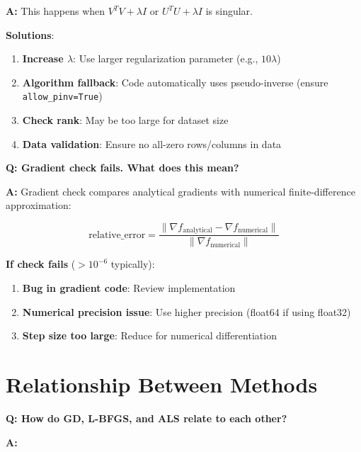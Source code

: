 \documentclass[11pt,oneside]{article}
\newcommand{\grad}{\nabla}
\newcommand{\question}[1]{\textbf{Q: #1}}
\newcommand{\answer}{\textbf{A: }}
\begin{document}
\answer This happens when $V^T V + \lambda I$ or $U^T U + \lambda I$ is singular.

\textbf{Solutions}:

\begin{enumerate}
    \item \textbf{Increase $\lambda$}: Use larger regularization parameter (e.g., $10 \lambda$)
    \item \textbf{Algorithm fallback}: Code automatically uses pseudo-inverse (ensure \texttt{allow\_pinv=True})
    \item \textbf{Check rank}: May be too large for dataset size
    \item \textbf{Data validation}: Ensure no all-zero rows/columns in data
\end{enumerate}

\medskip

\question{Gradient check fails. What does this mean?}

\answer Gradient check compares analytical gradients with numerical finite-difference approximation:

\begin{equation}
    \text{relative\_error} = \frac{\|\grad f_{\text{analytical}} - \grad f_{\text{numerical}}\|}{\|\grad f_{\text{numerical}}\|}
\end{equation}

\textbf{If check fails} ($> 10^{-6}$ typically):

\begin{enumerate}
    \item \textbf{Bug in gradient code}: Review implementation
    \item \textbf{Numerical precision issue}: Use higher precision (float64 if using float32)
    \item \textbf{Step size too large}: Reduce for numerical differentiation
\end{enumerate}

\section{Relationship Between Methods}\label{sec:relationship}

\question{How do GD, L-BFGS, and ALS relate to each other?}

\answer

\vspace{0.5cm}
\end{document}

